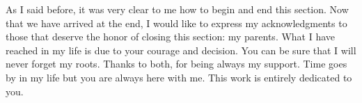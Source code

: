 As I said before, it was very clear to me how to begin and end this section. Now that
we have arrived at the end, I would like to express my acknowledgments to those that deserve
the honor of closing this section: my parents. What I have reached in my life is
due to your courage and decision. You can be sure that I will never forget my roots.
Thanks to both, for being always my support. Time goes by in my life but you
are always here with me. This work is entirely dedicated to you.

